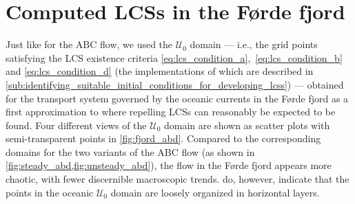 \section{Computed LCSs in the Førde fjord}
\label{sec:computed_lcss_in_the_forde_fjord}

Just like for the ABC flow, we used the $\mathcal{U}_{0}$ domain --- i.e.,
the grid points satisfying the LCS existence criteria
\eqref{eq:lcs_condition_a},~\eqref{eq:lcs_condition_b} and
\eqref{eq:lcs_condition_d} (the implementations of which are described in
\cref{sub:identifying_suitable_initial_conditions_for_developing_lcss}) ---
obtained for the transport system governed by the oceanic currents in the
Førde fjord as a first approximation to where repelling LCSs can reasonably
be expected to be found. Four different views of the $\mathcal{U}_{0}$ domain
are shown as scatter plots with semi-transparent points in
\cref{fig:fjord_abd}. Compared to the corresponding domains for the two
variants  of the ABC flow (as shown in \cref{fig:steady_abd,fig:unsteady_abd}),
the flow in the Førde fjord appears more chaotic, with fewer discernible
macroscopic trends.  do, however,
indicate that the points in the oceanic $\mathcal{U}_{0}$ domain are loosely
organized in horizontal layers.



